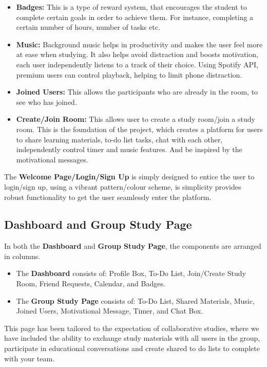 \begin{itemize}
    \item \textbf{Badges:} This is a type of reward system, that encourages the student to complete certain goals in order to achieve them. For instance, completing a certain number of hours, number of tasks etc.
    \item \textbf{Music: }Background music helps in productivity and makes the user feel more at ease when studying. It also helps avoid distraction and boosts motivation, each user independently listens to a track of their choice. Using Spotify API, premium users can control playback, helping to limit phone distraction.
    \item \textbf{Joined Users:} This allows the participants who are already in the room, to see who has joined.
    \item \textbf{Create/Join Room:} This allows user to create a study room/join a study room. This is the foundation of the project, which creates a platform for users to share learning materials, to-do list tasks, chat with each other, independently control timer and  music features.  And be inspired by the motivational messages.

\end{itemize}

The \textbf{Welcome Page/Login/Sign Up} is simply designed to entice the user to login/sign up, using a vibrant pattern/colour scheme, is simplicity provides robust functionality to get the user seamlessly enter the platform.

\subsection{Dashboard and Group Study Page}
In both the \textbf{Dashboard} and \textbf{Group Study Page}, the components are arranged in columns.

\begin{itemize}
    \item The \textbf{Dashboard} consists of: Profile Box, To-Do List, Join/Create Study Room, Friend Requests, Calendar, and Badges.
    \item The \textbf{Group Study Page} consists of: To-Do List, Shared Materials, Music, Joined Users, Motivational Message, Timer, and Chat Box.
\end{itemize}

This page has been tailored to the expectation of collaborative studies, where we have included the ability to exchange study materials with all users in the group, participate in educational conversations and create shared to do lists to complete with your team.

